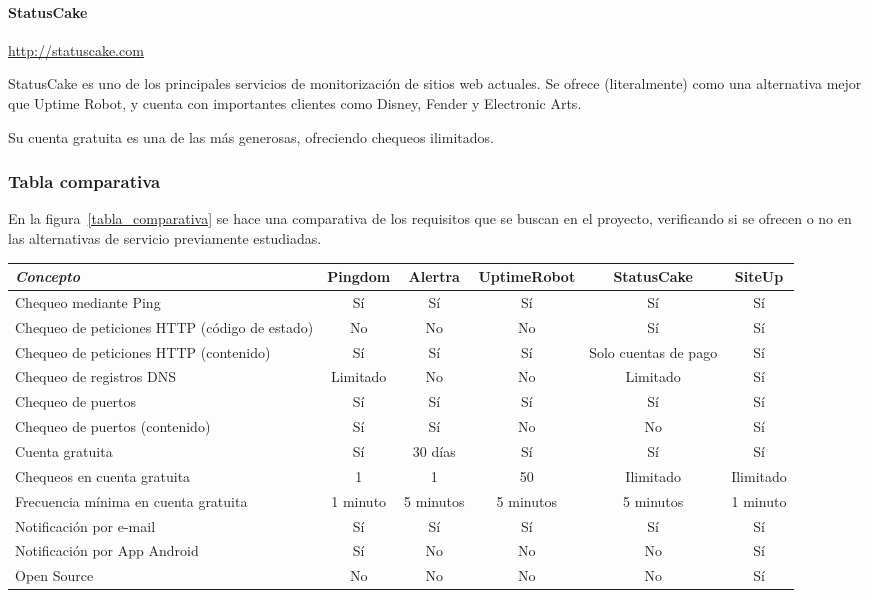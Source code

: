 \paragraph{StatusCake} \url{http://statuscake.com}

StatusCake es uno de los principales servicios de monitorización de sitios web
actuales. Se ofrece (literalmente) como una alternativa mejor que Uptime Robot,
y cuenta con importantes clientes como Disney, Fender y Electronic Arts.

Su cuenta gratuita es una de las más generosas, ofreciendo chequeos ilimitados.

\subsubsection{Tabla comparativa}

En la figura~\ref{tabla_comparativa} se hace una comparativa de los requisitos
que se buscan en el proyecto, verificando si se ofrecen o no en las alternativas de
servicio previamente estudiadas.

\begin{sidewaystable}
  \centering
  \label{tabla_comparativa}
  \begin{tabular}{|l|c|c|c|c|c|}
    \hline
    \textit{Concepto} & Pingdom & Alertra & UptimeRobot & StatusCake & SiteUp\\
    \hline
    Chequeo mediante Ping & Sí & Sí & Sí & Sí & Sí \\
    \hline    
    Chequeo de peticiones HTTP (código de estado) & No & No & No & Sí & Sí \\
    \hline
    Chequeo de peticiones HTTP (contenido) & Sí & Sí & Sí & Solo cuentas de pago & Sí \\
    \hline
    Chequeo de registros DNS & Limitado & No & No & Limitado & Sí \\
    \hline
    Chequeo de puertos & Sí & Sí & Sí & Sí & Sí \\
    \hline
    Chequeo de puertos (contenido) & Sí & Sí & No & No & Sí \\
    \hline
    Cuenta gratuita & Sí & 30 días & Sí & Sí & Sí \\
    \hline    
    Chequeos en cuenta gratuita & 1 & 1 & 50 & Ilimitado & Ilimitado \\
    \hline
    Frecuencia mínima en cuenta gratuita & 1 minuto & 5 minutos & 5 minutos & 5 minutos & 1 minuto \\
    \hline
    Notificación por e-mail & Sí & Sí & Sí & Sí & Sí \\
    \hline
    Notificación por App Android & Sí & No & No & No & Sí \\
    \hline
    Open Source & No & No & No & No & Sí \\
    \hline   
  \end{tabular}
  \caption{Tabla comparativa de servicios de monitorización}
\end{sidewaystable}

